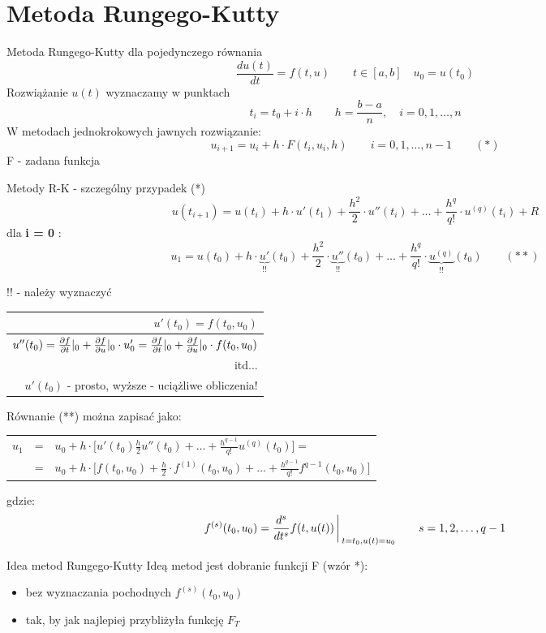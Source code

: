 \section{Metoda Rungego-Kutty}
\begin{frame}{Metoda Rungego-Kutty dla pojedynczego równania}
	$$\frac{du(t)}{dt}=f(t,u)\qquad t \in [a,b] \quad u_0 = u(t_0)$$
    Rozwiążanie $u(t)$ wyznaczamy w punktach
    $$t_i = t_0+i\cdot h \qquad h=\frac{b-a}{n}, \quad i = 0,1,\ldots,n$$
    W metodach jednokrokowych jawnych rozwiązanie:
    $$u_{i+1} = u_i + h\cdot F(t_i,u_i,h) \qquad i = 0,1,\ldots,n-1 \qquad(*)$$
    F - zadana funkcja
\end{frame}
\begin{frame}{Metody R-K - szczególny przypadek (*)}
	$$u(t_{i+1}) = u(t_i)+h\cdot u'(t_1)+\frac{h^2}{2}\cdot u''(t_i)+\ldots+\frac{h^q}{q!}\cdot u^{(q)}(t_i) + R$$
    dla \textbf{i = 0} :
    $$u_1 = u(t_0) + h\cdot \underbrace{u'}_{!!}(t_0)+\frac{h^2}{2}\cdot\underbrace{u''}_{!!}(t_0)+\ldots+\frac{h^q}{q!}\cdot \underbrace{u^{(q)}}_{!!}(t_0) \qquad (**) $$
    \begin{flushright}
    	!! - należy wyznaczyć
    \end{flushright}
    \begin{center}
    	\begin{tabular}{|r|} \hline
    		$u'(t_0)=f(t_0,u_0)$\\ \hline
        	$u''(t_0) = \frac{\partial f}{\partial t}\arrowvert_0+\frac{\partial f}{\partial u}\arrowvert_0 \cdot u'_0 = \frac{\partial f}{\partial t}\arrowvert_0 + \frac{\partial f}{\partial u}\arrowvert_0 \cdot f(t_0,u_0)$\\ \hline
        itd... \\ \hline
       		$u'(t_0)$ - prosto, wyższe - uciążliwe obliczenia!\\ \hline
    	\end{tabular}
    \end{center}
\end{frame}
\begin{frame}
	Równanie (**) można zapisać jako:
    \begin{tabular}{ccl}
    $u_1$ & = & $u_0+h \cdot \bigg[u'(t_0)\frac{h}{2}u''(t_0) +\ldots+\frac{h^{q-1}}{q!}u^{(q)}(t_0)\bigg] =$\\
     & = & $u_0 + h \cdot \bigg[f(t_0,u_0)+\frac{h}{2}\cdot f^{(1)}(t_0,u_0)+\ldots+\frac{h^{q-1}}{q!}f^{q-1}(t_0,u_0)\bigg]$
    \end{tabular}
    gdzie:
    $$f^{(s)}(t_0,u_0) = \frac{d^s}{dt^s}f(t,u(t))\bigg\arrowvert_{t=t_0, u(t)=u_0} \qquad s = 1,2,\ldots,q-1$$
    \begin{block}{Idea metod Rungego-Kutty}
    Ideą metod jest dobranie funkcji F (wzór *):
    	\begin{itemize}
          \item bez wyznaczania pochodnych $f^{(s)}(t_0,u_0)$
          \item tak, by jak najlepiej przybliżyła funkcję $F_T$
    	\end{itemize}
    \end{block}
\end{frame}
